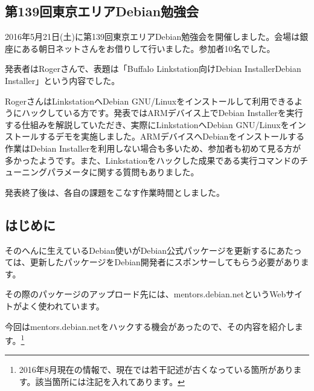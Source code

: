 \documentclass[mingoth,a4paper]{jsarticle}
\begin{document}
\begin{multicols}{2}

\end{multicols}



\subsection{第139回東京エリアDebian勉強会}

2016年5月21日(土)に第139回東京エリアDebian勉強会を開催しました。会場は銀座にある朝日ネットさんをお借りして行いました。参加者10名でした。

発表者はRogerさんで、表題は「Buffalo Linkstation向けDebian InstallerDebian Installer」という内容でした。

RogerさんはLinkstationへDebian GNU/Linuxをインストールして利用できるようにハックしている方です。発表ではARMデバイス上でDebian Installerを実行する仕組みを解説していただき、実際にLinkstationへDebian GNU/Linuxをインストールするデモを実施しました。ARMデバイスへDebianをインストールする作業はDebian Installerを利用しない場合も多いため、参加者も初めて見る方が多かったようです。また、Linkstationをハックした成果である実行コマンドのチューニングパラメータに関する質問もありました。

発表終了後は、各自の課題をこなす作業時間としました。



\subsection{はじめに}

そのへんに生えているDebian使いがDebian公式パッケージを更新するにあたっては、更新したパッケージをDebian開発者にスポンサーしてもらう必要があります。

その際のパッケージのアップロード先には、mentors.debian.netというWebサイトがよく使われています。

今回はmentors.debian.netをハックする機会があったので、その内容を紹介します。\footnote{2016年8月現在の情報で、現在では若干記述が古くなっている箇所があります。該当箇所には注記を入れてあります。}
\end{document}
